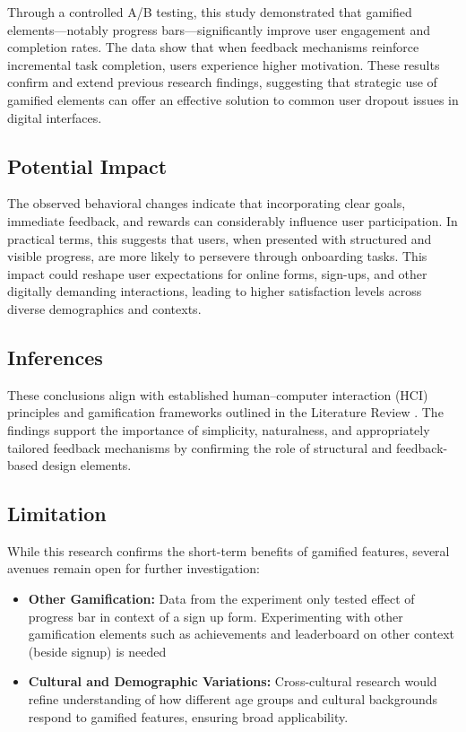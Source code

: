 \documentclass[conference]{IEEEtran}
\begin{document}
Through a controlled A/B testing, this study demonstrated that gamified elements---notably progress bars---significantly improve user engagement and completion rates. The data show that when feedback mechanisms reinforce incremental task completion, users experience higher motivation. These results confirm and extend previous research findings, suggesting that strategic use of gamified elements can offer an effective solution to common user dropout issues in digital interfaces.

\subsection{Potential Impact}
The observed behavioral changes indicate that incorporating clear goals, immediate feedback, and rewards can considerably influence user participation. In practical terms, this suggests that users, when presented with structured and visible progress, are more likely to persevere through onboarding tasks. This impact could reshape user expectations for online forms, sign-ups, and other digitally demanding interactions, leading to higher satisfaction levels across diverse demographics and contexts.

\subsection{Inferences}
These conclusions align with established human--computer interaction (HCI) principles and gamification frameworks outlined in the Literature Review \cite{cai2009, clanton1998, deliu2017}. The findings support the importance of simplicity, naturalness, and appropriately tailored feedback mechanisms by confirming the role of structural and feedback-based design elements.

\subsection{Limitation}
While this research confirms the short-term benefits of gamified features, several avenues remain open for further investigation:
\begin{itemize}
    \item \textbf{Other Gamification:} Data from the experiment only tested effect of progress bar in context of a sign up form. Experimenting with other gamification elements such as achievements and leaderboard on other context (beside signup) is needed
    \item \textbf{Cultural and Demographic Variations:} Cross-cultural research would refine understanding of how different age groups and cultural backgrounds respond to gamified features, ensuring broad applicability.
\end{itemize}
\end{document}
